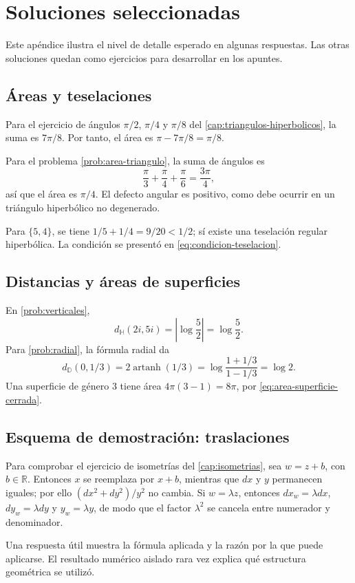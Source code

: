 \chapter{Soluciones seleccionadas}
\label{ap:soluciones}

Este apéndice ilustra el nivel de detalle esperado en algunas respuestas. Las otras soluciones quedan como ejercicios para desarrollar en los apuntes.

\section{Áreas y teselaciones}

Para el ejercicio de ángulos \(\pi/2\), \(\pi/4\) y \(\pi/8\) del \cref{cap:triangulos-hiperbolicos}, la suma es \(7\pi/8\). Por tanto, el área es \(\pi-7\pi/8=\pi/8\).

Para el problema \cref{prob:area-triangulo}, la suma de ángulos es
\[
  \frac{\pi}{3}+\frac{\pi}{4}+\frac{\pi}{6}
  =\frac{3\pi}{4},
\]
así que el área es \(\pi/4\). El defecto angular es positivo, como debe ocurrir en un triángulo hiperbólico no degenerado.

Para \(\{5,4\}\), se tiene \(1/5+1/4=9/20<1/2\); sí existe una teselación regular hiperbólica. La condición se presentó en \cref{eq:condicion-teselacion}.

\section{Distancias y áreas de superficies}

En \cref{prob:verticales},
\[
  d_{\mathbb H}(2i,5i)=\left|\log\frac{5}{2}\right|=\log\frac52.
\]
Para \cref{prob:radial}, la fórmula radial da
\[
  d_{\mathbb D}(0,1/3)=2\operatorname{artanh}(1/3)
  =\log\frac{1+1/3}{1-1/3}=\log 2.
\]
Una superficie de género \(3\) tiene área \(4\pi(3-1)=8\pi\), por \cref{eq:area-superficie-cerrada}.

\section{Esquema de demostración: traslaciones}

Para comprobar el ejercicio de isometrías del \cref{cap:isometrias}, sea \(w=z+b\), con \(b\in\mathbb R\). Entonces \(x\) se reemplaza por \(x+b\), mientras que \(dx\) y \(y\) permanecen iguales; por ello \((dx^2+dy^2)/y^2\) no cambia. Si \(w=\lambda z\), entonces \(dx_w=\lambda dx\), \(dy_w=\lambda dy\) y \(y_w=\lambda y\), de modo que el factor \(\lambda^2\) se cancela entre numerador y denominador.

\begin{remark}
Una respuesta útil muestra la fórmula aplicada y la razón por la que puede aplicarse. El resultado numérico aislado rara vez explica qué estructura geométrica se utilizó.
\end{remark}
